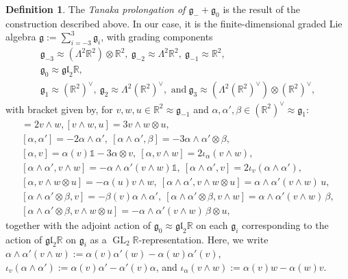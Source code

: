 \documentclass[12pt,a4paper]{amsart}
\theoremstyle{definition}
\newtheorem{definition}[theorem]{Definition}
\DeclareMathOperator{\GLin}{GL}
\begin{document}
\begin{definition}\label{tanakaprolongation} The \emph{Tanaka prolongation of $\mathfrak{g}_-+\mathfrak{g}_0$} is the result of the construction described above. In our case, it is the finite-dimensional graded Lie algebra $\mathfrak{g}:=\sum_{i=-3}^3\mathfrak{g}_i$, with grading components
\begin{gather*}\mathfrak{g}_{-3}\approx(\Lambda^2\mathbb{R}^2)\otimes\mathbb{R}^2,~ \mathfrak{g}_{-2}\approx\Lambda^2\mathbb{R}^2,~ \mathfrak{g}_{-1}\approx\mathbb{R}^2, \\ \mathfrak{g}_0\approx\mathfrak{gl}_2\mathbb{R}, \\ \mathfrak{g}_1\approx(\mathbb{R}^2)^\vee,~ \mathfrak{g}_2\approx\Lambda^2(\mathbb{R}^2)^\vee, \text{ and}~ \mathfrak{g}_3\approx(\Lambda^2(\mathbb{R}^2)^\vee)\otimes(\mathbb{R}^2)^\vee,\end{gather*}
with bracket given by, for $v,w,u\in\mathbb{R}^2\approx\mathfrak{g}_{-1}$ and $\alpha,\alpha',\beta\in(\mathbb{R}^2)^\vee\approx\mathfrak{g}_1$:
\begin{gather*}[v,w]=2v\wedge w, [v\wedge w,u]=3v\wedge w\otimes u, \\
[\alpha,\alpha']=-2\alpha\wedge\alpha',~ [\alpha\wedge\alpha',\beta]=-3\alpha\wedge\alpha'\otimes\beta, \\
[\alpha,v]=\alpha(v)\mathds{1}-3\alpha\otimes v,~ [\alpha,v\wedge w]=2\iota_\alpha(v\wedge w), \\
[\alpha\wedge\alpha',v\wedge w]=-\alpha\wedge\alpha'(v\wedge w)\mathds{1},~ [\alpha\wedge\alpha',v]=2\iota_v(\alpha\wedge\alpha'), \\
[\alpha,v\wedge w\otimes u]=-\alpha(u)v\wedge w,~[\alpha\wedge\alpha',v\wedge w\otimes u]=\alpha\wedge\alpha'(v\wedge w)\, u, \\
[\alpha\wedge\alpha'\otimes\beta,v]=-\beta(v)\alpha\wedge\alpha',~ [\alpha\wedge\alpha'\otimes\beta,v\wedge w]=\alpha\wedge\alpha'(v\wedge w)\,\beta, \\
[\alpha\wedge\alpha'\otimes\beta,v\wedge w\otimes u]=-\alpha\wedge\alpha'(v\wedge w)\,\beta\otimes u,\end{gather*}
together with the adjoint action of $\mathfrak{g}_0\approx\mathfrak{gl}_2\mathbb{R}$ on each $\mathfrak{g}_i$ corresponding to the action of $\mathfrak{gl}_2\mathbb{R}$ on $\mathfrak{g}_i$ as a $\GLin_2\mathbb{R}$-representation. Here, we write $\alpha\wedge\alpha'(v\wedge w):=\alpha(v)\alpha'(w)-\alpha(w)\alpha'(v)$, $\iota_v(\alpha\wedge\alpha'):=\alpha(v)\alpha'-\alpha'(v)\alpha$, and $\iota_\alpha(v\wedge w):=\alpha(v)w-\alpha(w)v$.
\end{definition}
\end{document}
